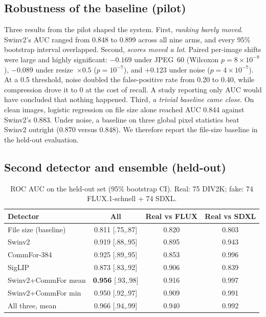 \documentclass[conference]{IEEEtran}
\newcommand{\ens}{Swinv2+CommFor}
\begin{document}
\subsection{Robustness of the baseline (pilot)}
\label{sec:pilot}
Three results from the pilot shaped the system. First, \emph{ranking barely
moved}. Swinv2's AUC ranged from 0.848 to 0.899 across all nine arms, and
every 95\% bootstrap interval overlapped. Second, \emph{scores moved a lot}.
Paired per-image shifts were large and highly significant: $-0.169$ under
JPEG~60 (Wilcoxon $p = 8\times10^{-8}$), $-0.089$ under resize~$\times0.5$
($p = 10^{-7}$), and $+0.123$ under noise ($p = 4\times10^{-7}$). At a 0.5
threshold, noise doubled the false-positive rate from 0.20 to 0.40, while
compression drove it to 0 at the cost of recall. A study reporting only AUC
would have concluded that nothing happened. Third, \emph{a trivial baseline
came close}. On clean images, logistic regression on file size alone
reached AUC 0.844 against Swinv2's 0.883. Under noise, a baseline on three
global pixel statistics beat Swinv2 outright (0.870 versus 0.848).
We therefore report the file-size baseline in the held-out evaluation.

\subsection{Second detector and ensemble (held-out)}

\begin{table}[t]
\caption{ROC AUC on the held-out set (95\% bootstrap CI). Real: 75 DIV2K;
fake: 74 FLUX.1-schnell + 74 SDXL.}
\label{tab:auc}
\centering
\footnotesize
\setlength{\tabcolsep}{3pt}
\begin{tabular}{@{}lccc@{}}
\toprule
Detector & All & Real vs FLUX & Real vs SDXL \\
\midrule
File size (baseline) & 0.811 {\scriptsize[.75,.87]} & 0.820 & 0.803 \\
Swinv2 & 0.919 {\scriptsize[.88,.95]} & 0.895 & 0.943 \\
CommFor-384 & 0.925 {\scriptsize[.89,.95]} & 0.853 & 0.996 \\
SigLIP & 0.873 {\scriptsize[.83,.92]} & 0.906 & 0.839 \\
\midrule
\ens{} mean & \textbf{0.956} {\scriptsize[.93,.98]} & 0.916 & 0.997 \\
\ens{} min & 0.950 {\scriptsize[.92,.97]} & 0.909 & 0.991 \\
All three, mean & 0.966 {\scriptsize[.94,.99]} & 0.940 & 0.992 \\
\bottomrule
\end{tabular}
\end{table}
\end{document}
